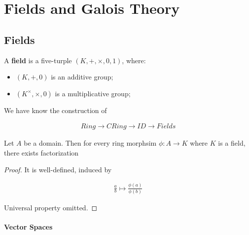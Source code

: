 \documentclass[Total.tex]{subfiles}
\begin{document}
	\chapter{Fields and Galois Theory}
		\section{Fields}
		
			\begin{Def}
				A \textbf{field} is a five-turple $(K,+,\times,0,1)$, where:
				
				\begin{itemize}
					\item $(K,+,0)$ is an additive group;
					
					\item $(K^\times,\times,0)$ is a multiplicative group; 
				\end{itemize}
			\end{Def}
			
			We have know the construction of
			
			\begin{gather*}
				Ring\rightarrow CRing\rightarrow ID\rightarrow Fields
			\end{gather*}
			
			\begin{proposition}
				Let $A$ be a domain. Then for every ring morphsim $\phi:A\rightarrow K$ where $K$ is a field, there exists factorization
				
				\begin{center}
				\end{center}
			\end{proposition}
			
			\begin{proof}
				It is well-defined, induced by
				
				\begin{gather*}
					\frac{a}{b}\mapsto \frac{\phi(a)}{\phi(b)}
				\end{gather*}
				
				Universal property omitted.	
			\end{proof}
			
			\subsubsection{Vector Spaces}
			
\end{document}
